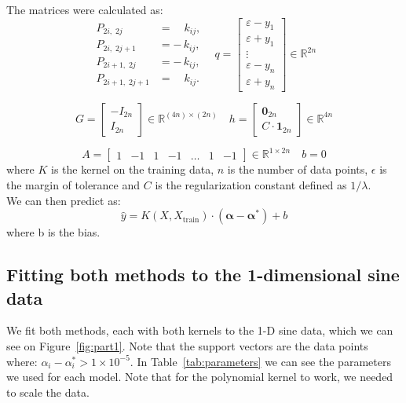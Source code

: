 \documentclass[9pt]{IEEEtran}
\begin{document}
The matrices were calculated as: 
\[
\begin{aligned}
P_{2i,\;2j}   &=\quad k_{ij},\\
P_{2i,\;2j+1} &= -\,k_{ij},\\
P_{2i+1,\;2j} &= -\,k_{ij},\\
P_{2i+1,\;2j+1} &=\quad k_{ij}.
\end{aligned}
\hspace{10pt}
q = 
\begin{bmatrix}
\varepsilon - y_1 \\ 
\varepsilon + y_1 \\ 
\vdots \\ 
\varepsilon - y_n \\ 
\varepsilon + y_n 
\end{bmatrix}
\in \mathbb{R}^{2n}
\]

\[
G = 
\begin{bmatrix}
 -I_{2n} \\ 
 I_{2n}
\end{bmatrix}
\in \mathbb{R}^{(4n) \times (2n)}
\quad
h = 
\begin{bmatrix}
 \mathbf{0}_{2n} \\ 
 C \cdot \mathbf{1}_{2n}
\end{bmatrix}
\in \mathbb{R}^{4n}
\]

\[
A = 
\begin{bmatrix}
 1 & -1 & 1 & -1 & \dots & 1 & -1
\end{bmatrix}
\in \mathbb{R}^{1 \times 2n}
\quad
b = 0
\]
where $K$ is the kernel on the training data, $n$ is the number of data points, 
$\epsilon$ is the margin of tolerance and $C$ is the regularization constant defined 
as $1/\lambda$.\\
We can then predict as: 
\[
\hat{y} = K(X, X_{\text{train}}) \cdot (\boldsymbol{\alpha} - \boldsymbol{\alpha}^*) + b
\]
where b is the bias.


\subsection{Fitting both methods to the 1-dimensional sine data}
We fit both methods, each with both kernels to the 1-D sine data, 
which we can see on Figure~\ref{fig:part1}. Note that the
 support vectors are the data points
  where: \( \alpha_i - \alpha_i^* > 1 \times 10^{-5} \).
   In Table~\ref{tab:parameters} we can see
the parameters we used for each model. Note that for the polynomial kernel to
work, we needed to scale the data.
\end{document}
